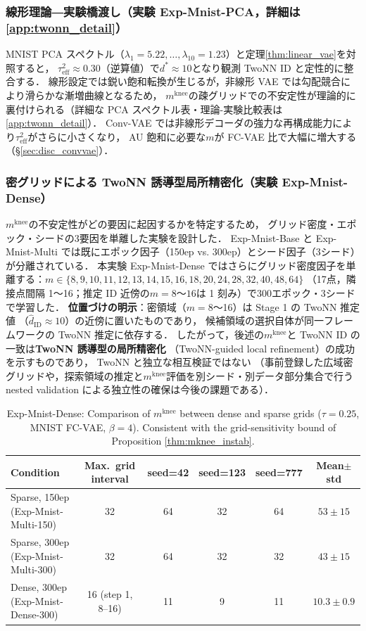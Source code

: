\documentclass[11pt,a4paper]{jsarticle}
\newcommand{\mknee}{m^{\mathrm{knee}}}
\begin{document}
\subsubsection{線形理論―実験橋渡し（実験 Exp-Mnist-PCA，詳細は\ref{app:twonn_detail}）}\label{sec:exp_em}

MNIST PCA スペクトル（$\lambda_1=5.22, \ldots, \lambda_{10}=1.23$）と定理\ref{thm:linear_vae}を対照すると，
$\tau^2_\mathrm{eff} \approx 0.30$（逆算値）で$d^* \approx 10$となり観測 TwoNN ID と定性的に整合する．
線形設定では鋭い飽和転換が生じるが，非線形 VAE では勾配競合により滑らかな漸増曲線となるため，
$\mknee$の疎グリッドでの不安定性が理論的に裏付けられる（詳細な PCA スペクトル表・理論-実験比較表は\ref{app:twonn_detail}）．
Conv-VAE では非線形デコーダの強力な再構成能力により$\tau^2_\mathrm{eff}$がさらに小さくなり，
AU 飽和に必要な$m$が FC-VAE 比で大幅に増大する（§\ref{sec:disc_convvae}）．

\subsubsection{密グリッドによる TwoNN 誘導型局所精密化（実験 Exp-Mnist-Dense）}\label{sec:exp_el}

$\mknee$の不安定性がどの要因に起因するかを特定するため，
グリッド密度・エポック・シードの3要因を単離した実験を設計した．
Exp-Mnist-Base と Exp-Mnist-Multi では既にエポック因子（150ep vs. 300ep）とシード因子（3シード）が分離されている．
本実験 Exp-Mnist-Dense ではさらにグリッド密度因子を単離する：$m \in \{8,9,10,11,12,13,14,15,16,18,20,24,28,32,40,48,64\}$
（17点，隣接点間隔 1〜16；推定 ID 近傍の$m=8$〜$16$は 1 刻み）で300エポック・3シードで学習した．
\textbf{位置づけの明示}：密領域（$m = 8$〜16）は Stage 1 の TwoNN 推定値
（$\hat{d}_\mathrm{ID} \approx 10$）の近傍に置いたものであり，
候補領域の選択自体が同一フレームワークの TwoNN 推定に依存する．
したがって，後述の$\mknee$と TwoNN ID の一致は\textbf{TwoNN 誘導型の局所精密化}
（TwoNN-guided local refinement）の成功を示すものであり，
TwoNN と独立な相互検証ではない
（事前登録した広域密グリッドや，探索領域の推定と$\mknee$評価を別シード・別データ部分集合で行う
nested validation による独立性の確保は今後の課題である）．

\begin{table}[H]
\centering
\caption{Exp-Mnist-Dense: Comparison of $\mknee$ between dense and sparse grids ($\tau=0.25$, MNIST FC-VAE, $\beta=4$). Consistent with the grid-sensitivity bound of Proposition \ref{thm:mknee_instab}.}
\label{tab:el_mknee}
\small
\begin{tabular}{lccccc}
\toprule
Condition & Max.\ grid interval & seed=42 & seed=123 & seed=777 & Mean$\pm$std \\
\midrule
Sparse, 150ep (Exp-Mnist-Multi-150) & 32 & 64 & 32 & 64 & $53 \pm 15$ \\
Sparse, 300ep (Exp-Mnist-Multi-300) & 32 & 64 & 32 & 32 & $43 \pm 15$ \\
Dense, 300ep (Exp-Mnist-Dense-300) & 16 (step 1, 8--16) & 11 & 9 & 11 & $10.3 \pm 0.9$ \\
\bottomrule
\end{tabular}
\end{table}
\end{document}
